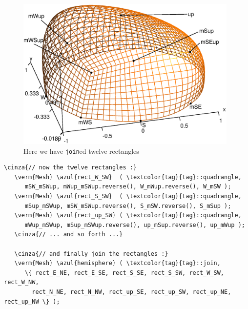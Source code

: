 \begin{figure}[ht] \centering
  \includegraphics[width=110mm]{hemisphere-2}
  \caption{Here we have {\small\tt join}ed twelve rectangles}
  \label{\numb section 2.\numb fig 7}
\end{figure}
	
\begin{Verbatim}[commandchars=\\\{\},formatcom=\small\tt,frame=single,
   label=parag-\ref{\numb section 2.\numb parag 7}.cpp,rulecolor=\color{coment},
   baselinestretch=0.94,framesep=2mm]
   \cinza{// now the twelve rectangles :}
   \verm{Mesh} \azul{rect_W_SW}  ( \textcolor{tag}{tag}::quadrangle,
      mSW_mSWup, mWup_mSWup.reverse(), W_mWup.reverse(), W_mSW );
   \verm{Mesh} \azul{rect_S_SW}  ( \textcolor{tag}{tag}::quadrangle,
      mSup_mSWup, mSW_mSWup.reverse(), S_mSW.reverse(), S_mSup );
   \verm{Mesh} \azul{rect_up_SW} ( \textcolor{tag}{tag}::quadrangle,
      mWup_mSWup, mSup_mSWup.reverse(), up_mSup.reverse(), up_mWup );
   \cinza{// ... and so forth ...}

   \cinza{// and finally join the rectangles :}
   \verm{Mesh} \azul{hemisphere} ( \textcolor{tag}{tag}::join,
      \{ rect_E_NE, rect_E_SE, rect_S_SE, rect_S_SW, rect_W_SW, rect_W_NW,
        rect_N_NE, rect_N_NW, rect_up_SE, rect_up_SW, rect_up_NE, rect_up_NW \} );
\end{Verbatim}

